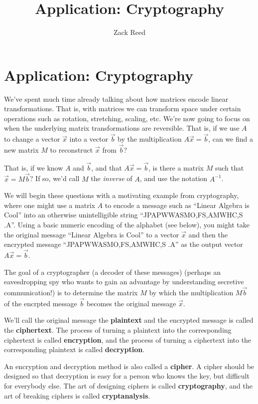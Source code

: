 \documentclass{ximera}
\author{Zack Reed}
\title{Application: Cryptography}
\begin{document}
\begin{abstract}

\end{abstract}
\maketitle


\section*{Application: Cryptography}

We've spent much time already talking about how matrices encode linear transformations. That is, with matrices we can transform space under certain operations such as rotation, stretching, scaling, etc. We're now going to focus on when the underlying matrix transformations are reversible. That is, if we use $A$ to change a vector $\vec{x}$ into a vector $\vec{b}$ by the multiplication $A\vec{x}=\vec{b}$, can we find a new matrix $M$ to reconstruct $\vec{x}$ from $\vec{b}$? 

That is, if we know $A$ and $\vec{b}$, and that $A\vec{x}=\vec{b}$, is there a matrix $M$ such that $\vec{x}=M\vec{b}$? If so, we'd call $M$ the \emph{inverse} of $A$, and use the notation $A^{-1}$.

We will begin these questions with a motivating example from cryptography, where one might use a matrix $A$ to encode a message such as ``Linear Algebra is Cool'' into an otherwise unintelligible string ``JPAPWWASMO,FS,AMWHC,S .A''. Using a basic numeric encoding of the alphabet (see below), you might take the original message ``Linear Algebra is Cool'' to a vector $\vec{x}$ and then the encrypted message ``JPAPWWASMO,FS,AMWHC,S .A'' as the output vector $A\vec{x}=\vec{b}$.

The goal of a cryptographer (a decoder of these messages) (perhaps an eavesdropping spy who wants to gain an advantage by understanding secretive communication!) is to determine the matrix $M$ by which the multiplication $M\vec{b}$ of the encrpted message $\vec{b}$ becomes the original message $\vec{x}$.

We'll call the original message the
\textbf{plaintext} and the encrypted message is called the
\textbf{ciphertext}. The process of turning a plaintext into the
corresponding ciphertext is called \textbf{encryption}, and the process of turning a ciphertext
into the corresponding plaintext is called \textbf{decryption}. 

An encryption and decryption method is also
called a \textbf{cipher}. A cipher should be designed so that decryption is
easy for a person who knows the key, but difficult for everybody
else. The art of designing ciphers is called \textbf{cryptography}, and the art of breaking ciphers is called
\textbf{cryptanalysis}.
\end{document}
